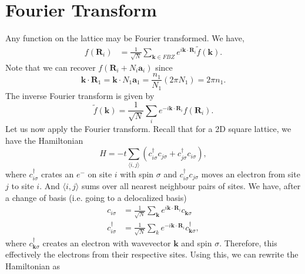 \documentclass{article}
\numberwithin{equation}{section}
\begin{document}
\section{Fourier Transform}
Any function on the lattice may be Fourier transformed. We have,
\begin{align}
    f(\bm{R}_i) &= \frac{1}{\sqrt{N}}\sum_{\bm{k} \in FBZ}e^{i\bm{k}\cdot \bm{R}_i}\tilde{f}(\bm{k}).
\end{align}
Note that we can recover $f(\bm{R}_i+N_i\bm{a}_i)$ since 
\begin{equation}
    \bm{k}\cdot \bm{R}_1 = \bm{k} \cdot N_1\bm{a}_1 = \frac{n_1}{N_1}(2\pi N_1) = 2\pi n_1.
\end{equation}
The inverse Fourier transform is given by 
\begin{equation}
    \tilde{f}(\bm{k}) = \frac{1}{\sqrt{N}}\sum_i e^{-i\bm{k}\cdot \bm{R}_i}f(\bm{R}_i).
\end{equation}
Let us now apply the Fourier transform. Recall that for a 2D square lattice, we have the Hamiltonian
\begin{equation}
    H = -t\sum_{\langle i,j\rangle} (c^\dagger_{i\sigma}c_{j\sigma} + c^\dagger_{j\sigma}c_{i\sigma}),
\end{equation}
where $c^\dagger_{i\sigma}$ crates an $e^{-}$ on site $i$ with spin $\sigma$ and $c^{\dagger}_{i\sigma}c_{j\sigma}$ moves an electron from site $j$ to site $i.$ And $\langle i,j\rangle$ sums over all nearest neighbour pairs of sites. We have, after a change of basis (i.e. going to a delocalized basis)
\begin{align}
    c_{i\sigma} &= \frac{1}{\sqrt{N}}\sum_{\bm{k}}e^{i\bm{k}\cdot \bm{R}_i}c_{\bm{k}\sigma} \\ 
    c^{\dagger}_{i\sigma} &= \frac{1}{\sqrt{N}}\sum_k e^{-i\bm{k}\cdot \bm{R}_i}c^{\dagger}_{\bm{k}\sigma},
\end{align}
where $c^\dagger_{\bm{k}\sigma}$ creates an electron with wavevector $\bm{k}$ and spin $\sigma.$ Therefore, this effectively  the electrons from their respective sites. Using this, we can rewrite the Hamiltonian as 
\end{document}
